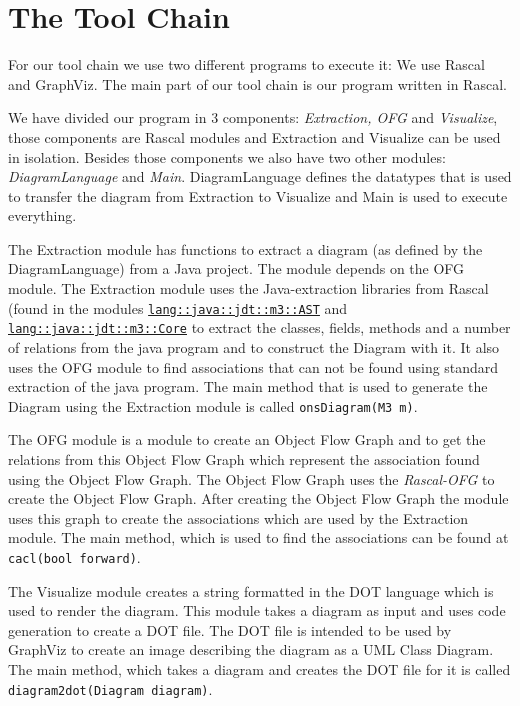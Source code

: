 \documentclass[a4paper,11pt]{article}
\begin{document}
	\section{The Tool Chain}
	For our tool chain we use two different programs to execute it: We use Rascal and GraphViz.
	The main part of our tool chain is our program written in Rascal.
	
	We have divided our program in 3 components: \emph{Extraction, OFG} and \emph{Visualize}, those components are Rascal modules and Extraction and Visualize can be used in isolation. 
	Besides those components we also have two other modules: \emph{DiagramLanguage} and \emph{Main}.
	DiagramLanguage defines the datatypes that is used to transfer the diagram from Extraction to Visualize and Main is used to execute everything.
	
	The Extraction module has functions to extract a diagram (as defined by the DiagramLanguage) from a Java project. The module depends on the OFG module.
	The Extraction module uses the Java-extraction libraries from Rascal (found in the modules \texttt{\url{lang::java::jdt::m3::AST}} and \texttt{\url{lang::java::jdt::m3::Core}} to extract the classes, fields, methods and a number of relations from the java program and to construct the Diagram with it.
	It also uses the OFG module to find associations that can not be found using standard extraction of the java program.
	The main method that is used to generate the Diagram using the Extraction module is called \texttt{onsDiagram(M3 m)}.
	
	The OFG module is a module to create an Object Flow Graph and to get the relations from this Object Flow Graph which represent the association found using the Object Flow Graph.
	The Object Flow Graph uses the \emph{Rascal-OFG}\cite{rascal-ofg} to create the Object Flow Graph.
	After creating the Object Flow Graph the module uses this graph to create the associations which are used by the Extraction module.
	The main method, which is used to find the associations can be found at \texttt{cacl(bool forward)}.
	
	The Visualize module creates a string formatted in the DOT language which is used to render the diagram.
	This module takes a diagram as input and uses code generation to create a DOT file.
	The DOT file is intended to be used by GraphViz to create an image describing the diagram as a UML Class Diagram.
	The main method, which takes a diagram and creates the DOT file for it is called \texttt{diagram2dot(Diagram diagram)}.
	
\end{document}
